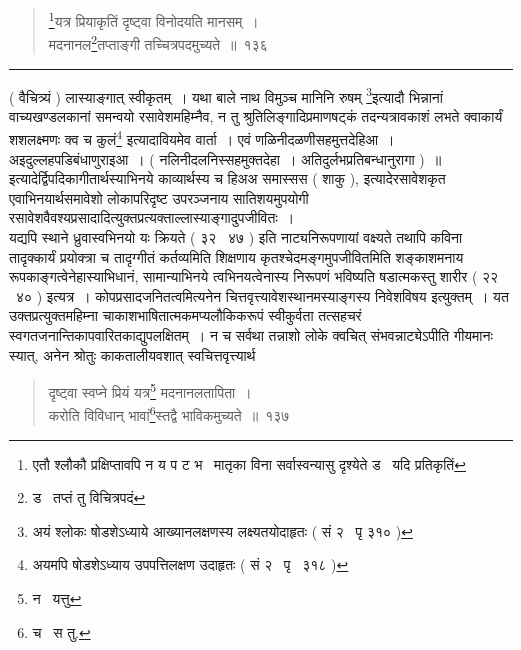 \documentclass[11pt, openany]{book}
\begin{document}
\newpage

\begin{quote}
{\na \renewcommand{\thefootnote}{1}\footnote{एतौ श्लौकौ प्रक्षिप्तावपि न य प ट भ \textendash\ मातृका विना सर्वास्वन्यासु दृश्येते ड \textendash\ यदि प्रतिकृतिं}यत्र प्रियाकृतिं दृष्ट्वा विनोदयति मानसम्~।\\
मदनानल\renewcommand{\thefootnote}{2}\footnote{ड \textendash\ तप्तं तु विचित्रपदं}तप्ताङ्गी तच्चित्रपदमुच्यते~॥~१३६}
\end{quote}

\hrule

\vspace{2mm}
\noindent
( वैचित्र्यं ) लास्याङ्गात् स्वीकृतम्~। यथा {\qt बाले नाथ विमुञ्च मानिनि रुषम्} \renewcommand{\thefootnote}{*}\footnote{अयं श्लोकः षोडशेऽध्याये आख्यानलक्षणस्य लक्ष्यतयोदाहृतः ( सं २ \textendash\ पृ ३१० )}इत्यादौ भिन्नानां वाच्यखण्डलकानां समन्वयो रसावेशमहिम्नैव, न तु श्रुतिलिङ्गादिप्रमाणषट्कं तदन्यत्रावकाशं लभते {\qt क्वाकार्यं शशलक्ष्मणः क्व च कुलं\renewcommand{\thefootnote}{$\ddagger$}\footnote{अयमपि षोडशेऽध्याय उपपत्तिलक्षण उदाहृतः ( सं २ \textendash\ पृ \textendash\ ३१८ )}} इत्यादावियमेव वार्ता~। एवं {\qt णळिनीदळणीसहमुत्तदेहिआ~। अइदुल्लहपडिबंधाणुराइआ~। ( नलिनीदलनिस्सहमुक्तदेहा~। अतिदुर्लभप्रतिबन्धानुरागा )~॥}\\

इत्यादेर्द्विपदिकागीतार्थस्याभिनये काव्यार्थस्य च {\qt हिअअ समास्सस} ( शाकु ), इत्यादेरसावेशकृत एवाभिनयार्थसमावेशो लोकापरिदृष्ट उपरञ्जनाय सातिशयमुपयोगी रसावेशवैवश्यप्रसादादित्युक्तप्रत्यक्ताल्लास्याङ्गादुपजीवितः~।\\

यद्यपि {\qt स्थाने ध्रुवास्वभिनयो यः क्रियते} ( ३२ \textendash\ ४७ ) इति नाट्यनिरूपणायां वक्ष्यते तथापि कविना तादृक्कार्यं प्रयोक्त्रा च तादृग्गीतं कर्तव्यमिति शिक्षणाय कृतश्चेदमङ्गमुपजीवितमिति शङ्काशमनाय रूपकाङ्गत्वेनेहास्याभिधानं, सामान्याभिनये त्वभिनयत्वेनास्य निरूपणं भविष्यति {\qt षडात्मकस्तु शारीर} ( २२ \textendash\ ४० ) इत्यत्र~। कोपप्रसादजनितत्वमित्यनेन चित्तवृत्त्यावेशस्थानमस्याङ्गस्य निवेशविषय इत्युक्तम्~। यत उक्तप्रत्युक्तमहिम्ना चाकाशभाषितात्मकमप्यलौकिकरूपं स्वीकुर्वता तत्सहचरं स्वगतजनान्तिकापवारितकाद्युपलक्षितम्~। न च सर्वथा तन्नाशो लोके क्वचित् संभवन्नाट्येऽपीति गीयमानः स्यात्, अनेन श्रोतुः काकतालीयवशात् स्वचित्तवृत्त्यार्थ \textendash

\newpage

\begin{quote}
{\na दृष्ट्वा स्वप्ने प्रियं यत्र\renewcommand{\thefootnote}{1}\footnote{न \textendash\ यत्तु} मदनानलतापिता~।\\
करोति विविधान् भावां\renewcommand{\thefootnote}{2}\footnote{च \textendash\ स तु.}स्तद्वै भाविकमुच्यते~॥~१३७}
\end{quote}
\end{document}

